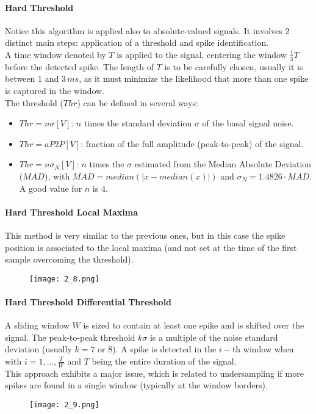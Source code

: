 \paragraph{Hard Threshold} Notice this algorithm is applied also to absolute-valued
signals. It involves 2 distinct main steps: application of a threshold and spike identification.\\
A time window denoted by \(T\) is applied to the signal, centering the window \(\frac{1}{3}T\) before the detected spike.
The length of \(T\) is to be carefully chosen, usually it is between \(1\) and \(3\,ms\), as it must minimize the likelihood
that more than one spike is captured in the window.\\
The threshold (\(Thr\)) can be defined in several ways:
\begin{itemize}
    \item \(Thr=n\sigma[V]\): \(n\) times the standard deviation \(\sigma\) of the basal signal noise.
    \item \(Thr=aP2P[V]\): fraction of the full amplitude (peak-to-peak) of the signal.
    \item \(Thr=n\sigma_N[V]\): \(n\) times the \(\sigma\) estimated from the
          Median Absolute Deviation (\(MAD\)), with \(MAD=median(|x-median(x)|)\) and \(\sigma_N=1.4826\cdot MAD\).
          A good value for \(n\) is \(4\).
\end{itemize}
\paragraph{Hard Threshold Local Maxima}
This method is very similar to the previous ones, but in this case the spike position is
associated to the local maxima (and not set at the time of the first sample overcoming the threshold).
\begin{figure}[H]
    \centering
    \texttt{[image: 2\_8.png]}
\end{figure}
\paragraph{Hard Threshold Differential Threshold}
A sliding window \(W\) is sized to contain at least one spike and is shifted over the signal.
The peak-to-peak threshold \(k\sigma\) is a multiple of the noise standard deviation (usually \(k=7\) or \(8\)).
A spike is detected in the \(i-\)th window when
\begin{equation*}
    [(max_i-min_i)\ge{k\sigma}]
\end{equation*}
with \(i=1,\dots,\frac{T}{W}\) and \(T\) being the entire duration of the signal.\\
This approach exhibits a major issue, which is related to undersampling if more spikes are found
in a single window (typically at the window borders).
\begin{figure}[H]
    \centering
    \texttt{[image: 2\_9.png]}
\end{figure}
